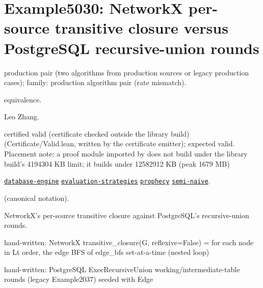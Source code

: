 \documentclass[10pt]{article}
\begin{document}
\Needspace{0.45\textheight}

\section{Example5030: NetworkX per-source transitive closure versus PostgreSQL recursive-union rounds}\label{case:Example5030}

\begin{description}[leftmargin=2.6cm,style=nextline,itemsep=1pt]

\item[Category] production pair (two algorithms from production sources or legacy production cases); family: production algorithm pair (rate mismatch).

\item[Kind] equivalence.

\item[Contributors] Leo Zhang.

\item[Status] certified valid (certificate checked outside the library build) (Certificate/Valid.lean, written by the certificate emitter); expected valid. Placement note: a proof module imported by  does not build under the library build's 4194304 KB limit; it builds under 12582912 KB (peak 1679 MB)

\item[Tags] \hyperref[tag:database-engine]{\texttt{database-engine}} \hyperref[tag:evaluation-strategies]{\texttt{evaluation-strategies}} \hyperref[tag:prophecy]{\texttt{prophecy}} \hyperref[tag:semi-naive]{\texttt{semi-naive}}.

\item[Input]  (canonical notation).

\item[Summary] NetworkX's per-source transitive closure against PostgreSQL's recursive-union rounds.

\item[Sides] hand-written: NetworkX transitive\_closure(G, reflexive=False) = for each node in Lt order, the edge BFS of edge\_bfs set-at-a-time (nested loop) \par hand-written: PostgreSQL ExecRecursiveUnion working/intermediate-table rounds (legacy Example2037) seeded with Edge


\end{description}
\end{document}
